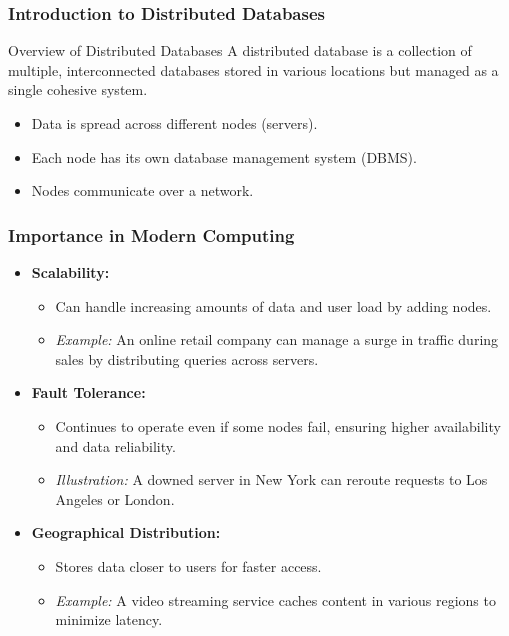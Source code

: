 \documentclass[aspectratio=169]{beamer}
\begin{document}
\frame{\titlepage}

\begin{frame}[fragile]
    \frametitle{Introduction to Distributed Databases}
    \begin{block}{Overview of Distributed Databases}
        A distributed database is a collection of multiple, interconnected databases stored in various locations but managed as a single cohesive system.
    \end{block}
    
    \begin{itemize}
        \item Data is spread across different nodes (servers).
        \item Each node has its own database management system (DBMS).
        \item Nodes communicate over a network.
    \end{itemize}
\end{frame}

\begin{frame}[fragile]
    \frametitle{Importance in Modern Computing}
    \begin{itemize}
        \item \textbf{Scalability:} 
            \begin{itemize}
                \item Can handle increasing amounts of data and user load by adding nodes.
                \item \textit{Example:} An online retail company can manage a surge in traffic during sales by distributing queries across servers.
            \end{itemize}
        
        \item \textbf{Fault Tolerance:} 
            \begin{itemize}
                \item Continues to operate even if some nodes fail, ensuring higher availability and data reliability.
                \item \textit{Illustration:} A downed server in New York can reroute requests to Los Angeles or London.
            \end{itemize}
        
        \item \textbf{Geographical Distribution:} 
            \begin{itemize}
                \item Stores data closer to users for faster access.
                \item \textit{Example:} A video streaming service caches content in various regions to minimize latency.
            \end{itemize}
    \end{itemize}
\end{frame}
\end{document}
